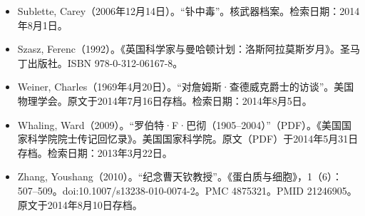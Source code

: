 \begin{itemize}
\item Sublette, Carey（2006年12月14日）。“钋中毒”。核武器档案。检索日期：2014年8月1日。
\item Szasz, Ferenc（1992）。《英国科学家与曼哈顿计划：洛斯阿拉莫斯岁月》。圣马丁出版社。ISBN 978-0-312-06167-8。
\item Weiner, Charles（1969年4月20日）。“对詹姆斯·查德威克爵士的访谈”。美国物理学会。原文于2014年7月16日存档。检索日期：2014年8月5日。
\item Whaling, Ward（2009）。“罗伯特·F·巴彻（1905–2004）”（PDF）。《美国国家科学院院士传记回忆录》。美国国家科学院。原文（PDF）于2014年5月31日存档。检索日期：2013年3月22日。
\item Zhang, Youshang（2010）。“纪念曹天钦教授”。《蛋白质与细胞》，1（6）：507–509。doi:10.1007/s13238-010-0074-2。PMC 4875321。PMID 21246905。原文于2014年8月10日存档。
\end{itemize}